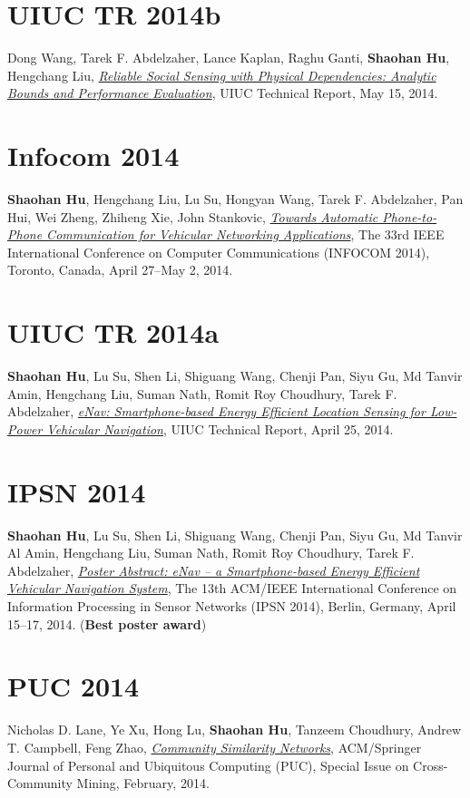 \section{\sc UIUC TR 2014b}\hypertarget{wang2014uiuc}{} Dong Wang, Tarek F. Abdelzaher, Lance Kaplan, Raghu Ganti, \textbf{Shaohan Hu}, Hengchang Liu, \href{https://www.ideals.illinois.edu/handle/2142/49113}{\emph{Reliable Social Sensing with Physical Dependencies: Analytic Bounds and Performance Evaluation}}, \textsf{UIUC Technical Report}, May 15, 2014.

\section{\sc Infocom 2014}\hypertarget{hu2014infocom}{} \textbf{Shaohan Hu}, Hengchang Liu, Lu Su, Hongyan Wang, Tarek F. Abdelzaher, Pan Hui, Wei Zheng, Zhiheng Xie, John Stankovic, \href{http://ieeexplore.ieee.org/xpl/articleDetails.jsp?arnumber=6848113}{\emph{Towards Automatic Phone-to-Phone Communication for Vehicular Networking Applications}}, \textsf{The 33rd IEEE International Conference on Computer Communications (INFOCOM 2014)}, Toronto, Canada, April 27--May 2, 2014.

\section{\sc UIUC TR 2014a }\hypertarget{hu2014uiuc1}{} \textbf{Shaohan Hu}, Lu Su, Shen Li, Shiguang Wang, Chenji Pan, Siyu Gu, Md Tanvir Amin, Hengchang Liu, Suman Nath, Romit Roy Choudhury, Tarek F. Abdelzaher, \href{https://www.ideals.illinois.edu/handle/2142/48917}{\emph{eNav: Smartphone-based Energy Efficient Location Sensing for Low-Power Vehicular Navigation}}, \textsf{UIUC Technical Report}, April 25, 2014.

\section{\sc IPSN 2014}\hypertarget{hu2014ipsn}{} \textbf{Shaohan Hu}, Lu Su, Shen Li, Shiguang Wang, Chenji Pan, Siyu Gu, Md Tanvir Al Amin, Hengchang Liu, Suman Nath, Romit Roy Choudhury, Tarek F. Abdelzaher, \href{http://dl.acm.org/citation.cfm?id=2602374}{\emph{Poster Abstract: eNav -- a Smartphone-based Energy Efficient Vehicular Navigation System}}, \textsf{The 13th ACM/IEEE International Conference on Information Processing in Sensor Networks (IPSN 2014)}, Berlin, Germany, April 15--17, 2014. (\textbf{Best poster award})

\section{\sc PUC 2014}\hypertarget{lane2013puc}{} Nicholas D. Lane, Ye Xu, Hong Lu, \textbf{Shaohan Hu}, Tanzeem Choudhury, Andrew T. Campbell, Feng Zhao, \href{http://link.springer.com/article/10.1007/s00779-013-0655-1}{\emph{Community Similarity Networks}}, \textsf{ACM/Springer Journal of Personal and Ubiquitous Computing (PUC), Special Issue on Cross-Community Mining}, February, 2014.

